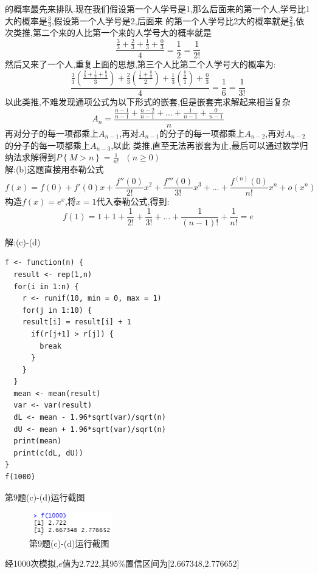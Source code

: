 \documentclass{book}
\begin{document}
的概率最先来排队.现在我们假设第一个人学号是1,那么后面来的第一个人,学号比1大的概率是$\frac{3}{3}$,假设第一个人学号是2,后面来
的第一个人学号比2大的概率就是$\frac{2}{3}$,依次类推,第二个来的人比第一个来的人学号大的概率就是
$$
    \frac{\frac{3}{3}+\frac{2}{3}+\frac{1}{3}+\frac{0}{3}}{4} = \frac{1}{2} = \frac{1}{2!}
$$
然后又来了一个人,重复上面的思想,第三个人比第二个人学号大的概率为:
$$
    \frac{\frac{3}{3}(\frac{\frac{2}{2}+\frac{1}{2}+\frac{0}{2}}{3})+\frac{2}{3}(\frac{\frac{1}{2}+\frac{0}{2}}{2})
        +\frac{1}{3}(\frac{\frac{0}{2}}{1})+\frac{0}{3}}{4} = \frac{1}{6} = \frac{1}{3!}
$$
以此类推,不难发现通项公式为以下形式的嵌套,但是嵌套完求解起来相当复杂
$$
    A_{n} = \frac{\frac{n-1}{n-1}+\frac{n-2}{n-1}+...+\frac{1}{n-1}+\frac{0}{n-1}}{n}
$$
再对分子的每一项都乘上$A_{n-1}$,再对$A_{n-1}$的分子的每一项都乘上$A_{n-2}$,再对$A_{n-2}$的分子的每一项都乘上$A_{n-3}$,以此
类推,直至无法再嵌套为止,最后可以通过数学归纳法求解得到$P\left\{M > n\right\} = \frac{1}{n!} \ \ \ (n \geq 0)$ \\

\noindent
解:(b)这题直接用泰勒公式 \\
$$
    f(x) = f(0) + f'(0)x + \frac{f''(0)}{2!}x^{2} + \frac{f'''(0)}{3!}x^{3} +...+\frac{f^{(n)}(0)}{n!}x^{n} + o(x^{n})
$$
构造$f(x) = e^{x}$,将$x=1$代入泰勒公式,得到:
$$
    f(1) = 1+1+\frac{1}{2!}+\frac{1}{3!}+...+\frac{1}{(n-1)!}+\frac{1}{n!} = e
$$

\noindent
解:(c)-(d)
\lstset{language = R}
\begin{lstlisting}
f <- function(n) {
  result <- rep(1,n)
  for(i in 1:n) {
    r <- runif(10, min = 0, max = 1)
    for(j in 1:10) {
    result[i] = result[i] + 1
      if(r[j+1] > r[j]) {
        break
      } 
    }  
  }
  mean <- mean(result)
  var <- var(result)
  dL <- mean - 1.96*sqrt(var)/sqrt(n)
  dU <- mean + 1.96*sqrt(var)/sqrt(n)
  print(mean)
  print(c(dL, dU))
}
f(1000)
\end{lstlisting}
第9题(c)-(d)运行截图
\begin{figure}[H]
    \centering
    \includegraphics*[height = 1cm, width = 3.7cm]{gramFile/第9题(c)-(d)运行截图.PNG}
    \caption{第9题(c)-(d)运行截图}
\end{figure}
\noindent
经1000次模拟,$e$值为2.722,其95\%置信区间为[2.667348,2.776652]

\hspace*{\fill} \\
\end{document}
